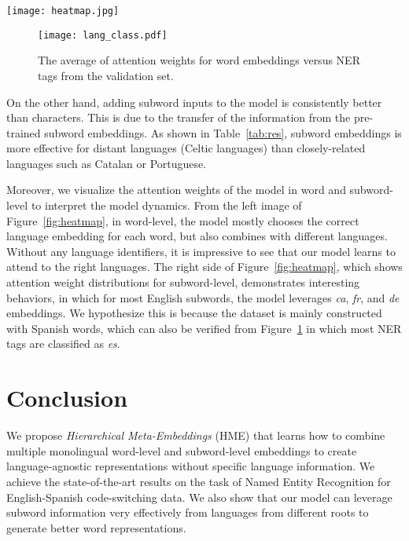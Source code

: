 \documentclass[11pt,a4paper]{article}
\begin{document}
\begin{figure*}[!t]
    \centering
    \texttt{[image: heatmap.jpg]}
    \caption{Heatmap of attention over languages from a validation sample. \textbf{Left}: word-level MME, \textbf{Right}: BPE-level MME. We extract the attention weights from a multilingual model (\textit{en-es-ca-pt-de-fr-it}).}
    \label{fig:heatmap}
\end{figure*}

\begin{figure}[!t]
    \centering
    \texttt{[image: lang\_class.pdf]}
    \caption{The average of attention weights for word embeddings versus NER tags from the validation set.}
    \label{fig:lang_class}
\end{figure}

On the other hand, adding subword inputs to the model is consistently better than characters. This is due to the transfer of the information from the pre-trained subword embeddings. As shown in Table~\ref{tab:res}, subword embeddings is more effective for distant languages (Celtic languages) than closely-related languages such as Catalan or Portuguese.

Moreover, we visualize the attention weights of the model in word and subword-level to interpret the model dynamics. From the left image of Figure~\ref{fig:heatmap}, in word-level, the model mostly chooses the correct language embedding for each word, but also combines with different languages. Without any language identifiers, it is impressive to see that our model learns to attend to the right languages. The right side of Figure~\ref{fig:heatmap}, which shows attention weight distributions for subword-level, demonstrates interesting behaviors, in which for most English subwords, the model leverages \textit{ca}, \textit{fr}, and \textit{de} embeddings. We hypothesize this is because the dataset is mainly constructed with Spanish words, which can also be verified from Figure~\ref{fig:lang_class} in which most NER tags are classified as \textit{es}.





















\section{Conclusion}
We propose \textit{Hierarchical Meta-Embeddings} (HME) that learns how to combine multiple monolingual word-level and subword-level embeddings to create language-agnostic representations without specific language information. We achieve the state-of-the-art results on the task of Named Entity Recognition for English-Spanish code-switching data. We also show that our model can leverage subword information very effectively from languages from different roots to generate better word representations. 
\end{document}
